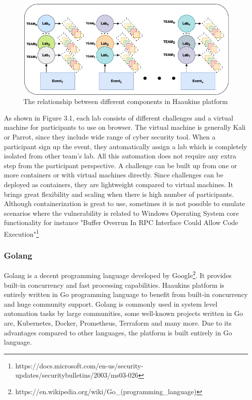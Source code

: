 \begin{figure}[htbp]
\centerline{\includegraphics[scale=.5]{figures/relationship-diagram.png}}
\caption{The relationship between different components in Haaukins platform}
\label{fig}
\end{figure}
 
As shown in Figure 3.1, each lab consists of different challenges and a virtual machine for participants to use on browser. The virtual machine is generally Kali or Parrot, since they include wide range of cyber security tool. When a participant sign up the event, they automatically assign a lab which is completely isolated from other team's lab. All this automation does not require any extra step from the participant perspective. A challenge can be built up from one or more containers or with virtual machines directly. Since challenges can be deployed as containers, they are lightweight compared to virtual machines. It brings great flexibility and scaling when there is high number of participants. Although containerization is great to use, sometimes it is not possible to emulate scenarios where the vulnerability is related to Windows Operating System core functionality for instance "Buffer Overrun In RPC Interface Could Allow Code Execution"\footnote{https://docs.microsoft.com/en-us/security-updates/securitybulletins/2003/ms03-026}


\subsubsection{Golang}

Golang is a decent programming language developed by Google\footnote{https://en.wikipedia.org/wiki/Go_(programming_language)}. It provides built-in concurrency and fast processing capabilities. Haaukins platform is entirely written in Go programming language to benefit from built-in concurrency and huge community support. 
Golang is commonly used in system level automation tasks by large communities, some well-known projects written in Go are, Kubernetes, Docker, Prometheus, Terraform and many more. 
Due to its advantages compared to other languages, the platform is built entirely in Go language. 


